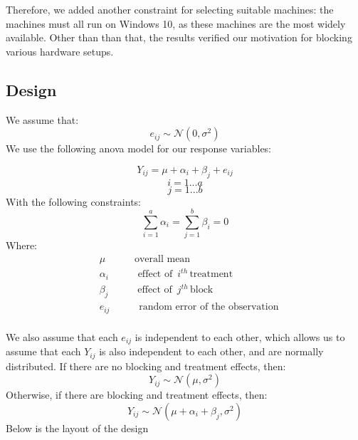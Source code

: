 \documentclass[12pt,halfline,a4paper,]{ouparticle}
\begin{document}
Therefore, we added another constraint for selecting suitable machines:
the machines must all run on Windows 10, as these machines are the most
widely available. Other than than that, the results verified our
motivation for blocking various hardware setups.

\hypertarget{design}{%
\subsection{Design}\label{design}}

We assume that: \[
e_{ij} \sim \mathcal{N}(0, \sigma^2)
\] We use the following anova model for our response variables:

\[
Y_{ij} = \mu + \alpha_i + \beta_j+ e_{ij}
\] \[
i = 1 ...a
\] \[
j = 1 ...b
\] With the following constraints: \[
\sum_{i=1}^a \alpha_i = \sum_{j=1}^b \beta_i =0 
\] Where: \[
\begin{aligned}
&\mu\hspace{35pt}  \text{overall mean} \\
&\alpha_i\hspace{35pt} \text{effect of }\, i^{th}\, \text{treatment}\\
&\beta_j\hspace{35pt} \text{effect of }\, j^{th}\, \text{block}\\
&e_{ij}\hspace{35pt} \text{random error of the observation}\\
\end{aligned}
\]

We also assume that each \(e_{ij}\) is independent to each other, which
allows us to assume that each \(Y_{ij}\) is also independent to each
other, and are normally distributed. If there are no blocking and
treatment effects, then: \[
Y_{ij} \sim \mathcal{N}(\mu, \sigma^2)
\] Otherwise, if there are blocking and treatment effects, then: \[
Y_{ij} \sim \mathcal{N}(\mu + \alpha_i + \beta_j, \sigma^2)
\] Below is the layout of the design
\end{document}
